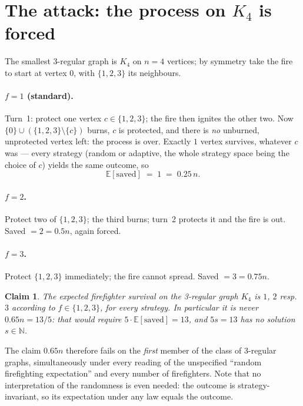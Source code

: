 \documentclass[11pt]{article}
\theoremstyle{plain}
\newtheorem*{claim}{Claim}
\begin{document}
\section{The attack: the process on $K_4$ is forced}
\label{sec:k4}

The smallest 3-regular graph is $K_4$ on $n=4$ vertices; by symmetry take
the fire to start at vertex $0$, with $\{1,2,3\}$ its neighbours.

\paragraph{$f=1$ (standard).}
Turn~1: protect one vertex $c\in\{1,2,3\}$; the fire then ignites the other
two.  Now $\{0\}\cup(\{1,2,3\}\setminus\{c\})$ burns, $c$ is protected, and
there is \emph{no} unburned, unprotected vertex left: the process is over.
Exactly $1$ vertex survives, whatever $c$ was --- every strategy (random or
adaptive, the whole strategy space being the choice of $c$) yields the same
outcome, so
\[
  \mathbb{E}[\text{saved}] \;=\; 1 \;=\; 0.25\,n .
\]

\paragraph{$f=2$.}
Protect two of $\{1,2,3\}$; the third burns; turn~2 protects it and the fire
is out.  Saved $=2=0.5n$, again forced.

\paragraph{$f=3$.}
Protect $\{1,2,3\}$ immediately; the fire cannot spread.  Saved $=3=0.75n$.

\begin{claim}
The expected firefighter survival on the 3-regular graph $K_4$ is $1$, $2$
resp.\ $3$ according to $f\in\{1,2,3\}$, for every strategy.  In particular
it is never $0.65n = 13/5$: that would require $5\cdot\mathbb{E}[\text{saved}]
= 13$, and $5s=13$ has no solution $s\in\mathbb{N}$.
\end{claim}

The claim $0.65n$ therefore fails on the \emph{first} member of the class of
3-regular graphs, simultaneously under every reading of the unspecified
``random firefighting expectation'' and every number of firefighters.  Note
that no interpretation of the randomness is even needed: the outcome is
strategy-invariant, so its expectation under any law equals the outcome.
\end{document}

